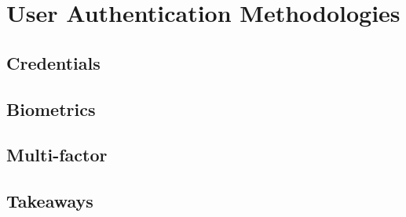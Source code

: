 \section{User Authentication Methodologies}

\subsection{Credentials}

\subsection{Biometrics}

\subsection{Multi-factor}

\subsection{Takeaways}